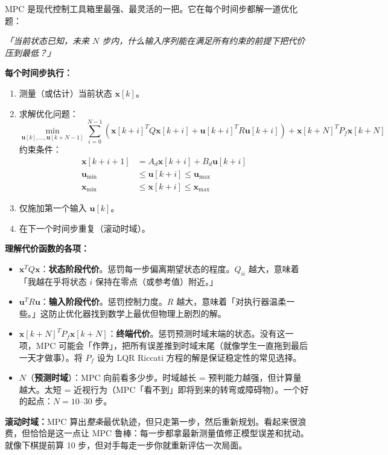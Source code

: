 MPC 是现代控制工具箱里最强、最灵活的一把。它在每个时间步都解一道优化题：

\textit{「当前状态已知，未来 $N$ 步内，什么输入序列能在满足所有约束的前提下把代价压到最低？」}

\textbf{每个时间步执行：}
\begin{enumerate}
    \item 测量（或估计）当前状态 $\mathbf{x}[k]$。
    \item 求解优化问题：
    \begin{equation}
    \min_{\mathbf{u}[k], \ldots, \mathbf{u}[k+N-1]} \sum_{i=0}^{N-1} \left( \mathbf{x}[k+i]^T Q \mathbf{x}[k+i] + \mathbf{u}[k+i]^T R \mathbf{u}[k+i] \right) + \mathbf{x}[k+N]^T P_f \mathbf{x}[k+N]
    \end{equation}
    约束条件：
    \begin{align}
    \mathbf{x}[k+i+1] &= A_d \mathbf{x}[k+i] + B_d \mathbf{u}[k+i] \\
    \mathbf{u}_{\min} &\leq \mathbf{u}[k+i] \leq \mathbf{u}_{\max} \\
    \mathbf{x}_{\min} &\leq \mathbf{x}[k+i] \leq \mathbf{x}_{\max}
    \end{align}
    \item 仅施加第一个输入 $\mathbf{u}[k]$。
    \item 在下一个时间步重复（滚动时域）。
\end{enumerate}

\textbf{理解代价函数的各项：}
\begin{itemize}
    \item $\mathbf{x}^T Q \mathbf{x}$：\textbf{状态阶段代价}。惩罚每一步偏离期望状态的程度。$Q_{ii}$ 越大，意味着「我越在乎将状态 $i$ 保持在零点（或参考值）附近。」
    \item $\mathbf{u}^T R \mathbf{u}$：\textbf{输入阶段代价}。惩罚控制力度。$R$ 越大，意味着「对执行器温柔一些。」这防止优化器找到数学上最优但物理上剧烈的解。
    \item $\mathbf{x}[k+N]^T P_f \mathbf{x}[k+N]$：\textbf{终端代价}。惩罚预测时域末端的状态。没有这一项，MPC 可能会「作弊」，把所有误差推到时域末尾（就像学生一直拖到最后一天才做事）。将 $P_f$ 设为 LQR Riccati 方程的解是保证稳定性的常见选择。
    \item $N$（\textbf{预测时域}）：MPC 向前看多少步。时域越长 = 预判能力越强，但计算量越大。太短 = 近视行为（MPC「看不到」即将到来的转弯或障碍物）。一个好的起点：$N = 10$--$30$ 步。
\end{itemize}

\textbf{滚动时域：}MPC 算出\textit{整条}最优轨迹，但只走第一步，然后重新规划。看起来很浪费，但恰恰是这一点让 MPC 鲁棒：每一步都拿最新测量值修正模型误差和扰动。就像下棋提前算 10 步，但对手每走一步你就重新评估一次局面。

